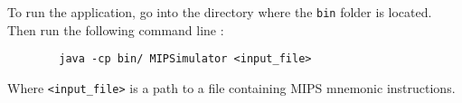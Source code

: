 
	To run the application, go into the directory where the \verb?bin? folder is located. Then run the following command line :
	\begin{verbatim}
		java -cp bin/ MIPSimulator <input_file>
	\end{verbatim}
	
	Where \verb?<input_file>? is a path to a file containing MIPS mnemonic instructions.